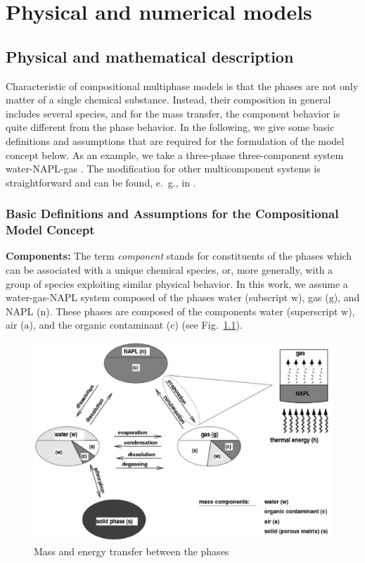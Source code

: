 \chapter[Models]{Physical and numerical models}

\section{Physical and mathematical description} 

Characteristic of compositional multiphase models is that the phases
are not only matter of a single chemical substance. Instead, their
composition in general includes several species, and for the mass transfer, 
the component behavior is quite different from the phase behavior. In the following, we
give some basic definitions and assumptions that are required for the
formulation of the model concept below. As an example, we take a
three-phase three-component system water-NAPL-gas
\cite{A3:class:2002a}. The modification for other multicomponent
systems is straightforward and can be found, e.\ g., in
\cite{A3:bielinski:2006,A3:acosta:2006}.

\subsection{Basic Definitions and Assumptions for the Compositional
  Model Concept}
\textbf{Components:}
The term \textit{component} stands for constituents of the phases which
can be associated with a unique chemical species, or, more generally, with 
a group of species exploiting similar physical behavior. In this work, we
assume a water-gas-NAPL system composed of the phases water (subscript
$\text{w}$), gas ($\text{g}$), and NAPL ($\text{n}$). These phases are
composed of the components water (superscript $\text{w}$), air
($\text{a}$), and the organic contaminant ($\text{c}$) (see Fig.\
\ref{A3:fig:mundwtrans}).
%
\begin{figure}[hbt]
  \centering
  \includegraphics[width=0.7\linewidth]{EPS/masstransfer}
  \caption{Mass and energy transfer between the phases}
  \label{A3:fig:mundwtrans}
\end{figure}

